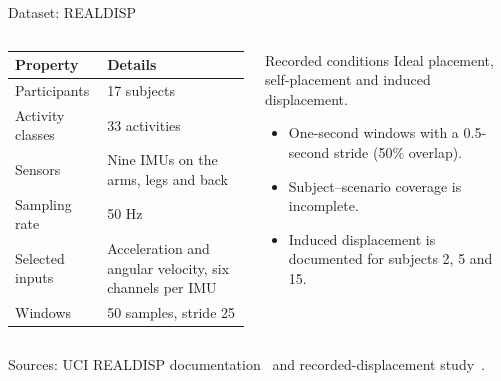 \documentclass[10pt,aspectratio=169]{beamer}
\begin{document}
\begin{frame}[t]{Dataset: REALDISP}
\begin{columns}[T,onlytextwidth]
\begin{column}{0.55\textwidth}
\setlength{\tabcolsep}{4pt}
\renewcommand{\arraystretch}{1.35}
\begin{tabularx}{\textwidth}{|P{0.36\textwidth}|Y|}
\hline
{}
\textbf{Property} & \textbf{Details} \\
\hline
Participants & 17 subjects \\
\hline
Activity classes & 33 activities \\
\hline
Sensors & Nine IMUs on the arms, legs and back \\
\hline
Sampling rate & 50 Hz \\
\hline
Selected inputs & Acceleration and angular velocity, six channels per IMU \\
\hline
Windows & 50 samples, stride 25 \\
\hline
\end{tabularx}
\end{column}
\begin{column}{0.41\textwidth}
\begin{block}{Recorded conditions}
Ideal placement, self-placement and induced displacement.
\end{block}
\begin{itemize}
\item One-second windows with a 0.5-second stride (50\% overlap).
\item Subject--scenario coverage is incomplete.
\item Induced displacement is documented for subjects 2, 5 and 15.
\end{itemize}
\end{column}
\end{columns}
\medskip
{\footnotesize Sources: UCI REALDISP documentation~\cite{realdisp} and recorded-displacement study~\cite{banos}.}
\end{frame}
\end{document}
